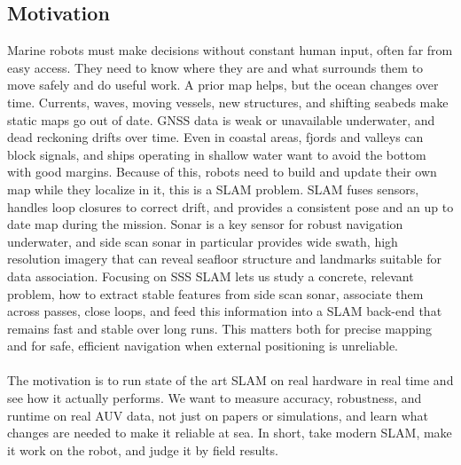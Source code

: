 \subsection{Motivation}
Marine robots must make decisions without constant human input, often far from easy access. They need to know where they are and what surrounds them to move safely and do useful work. A prior map helps, but the ocean changes over time. Currents, waves, moving vessels, new structures, and shifting seabeds make static maps go out of date. \gls{GNSS} data is weak or unavailable underwater, and dead reckoning drifts over time. Even in coastal areas, fjords and valleys can block signals, and ships operating in shallow water want to avoid the bottom with good margins. Because of this, robots need to build and update their own map while they localize in it, this is a \gls{SLAM} problem. \gls{SLAM} fuses sensors, handles loop closures to correct drift, and provides a consistent pose and an up to date map during the mission. Sonar is a key sensor for robust navigation underwater, and side scan sonar in particular provides wide swath, high resolution imagery that can reveal seafloor structure and landmarks suitable for data association. Focusing on \gls{SSS SLAM} lets us study a concrete, relevant problem, how to extract stable features from side scan sonar, associate them across passes, close loops, and feed this information into a \gls{SLAM} back-end that remains fast and stable over long runs. This matters both for precise mapping and for safe, efficient navigation when external positioning is unreliable.
\\ \\
The motivation is to run state of the art \gls{SLAM} on real hardware in real time and see how it actually performs. We want to measure accuracy, robustness, and runtime on real \gls{AUV} data, not just on papers or simulations, and learn what changes are needed to make it reliable at sea. In short, take modern \gls{SLAM}, make it work on the robot, and judge it by field results.